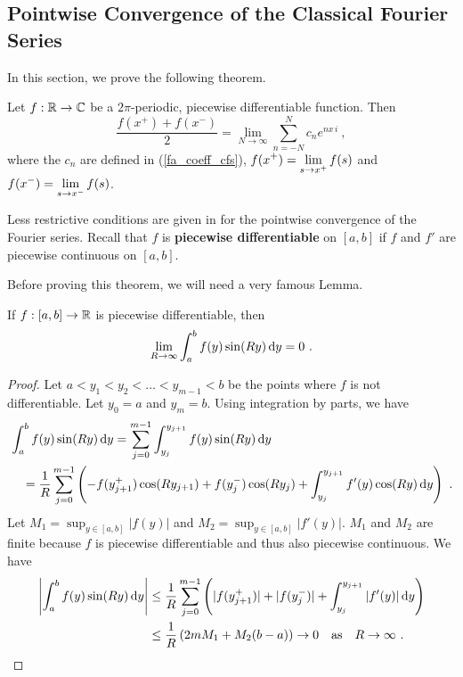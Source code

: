 \subsection{Pointwise Convergence of the Classical Fourier Series}
\label{sectPtWsConv}

In this section, we prove the following theorem.

\begin{theorem}
Let $f:\mathbb{R}\to \mathbb{C}$ be a $2\pi$-periodic,     { \label{faFsPwc} }
piecewise differentiable function.  Then
\[
\frac{f(x^+) + f(x^-)}{2} = \lim_{N\to \infty} \sum_{n=-N}^N c_n e^{n x\, i} \ ,
\]
where the $c_n$ are defined in (\ref{fa_coeff_cfs}),
$\displaystyle f(x^+) = \lim_{s\to x^+} f(s)$ and
$\displaystyle f(x^-) = \lim_{s\to x^-} f(s)$.
\end{theorem}

Less restrictive conditions are given in \cite{RuPMA} for the
pointwise convergence of the Fourier series.  Recall that $f$ is
{\bfseries piecewise differentiable}
on $[a,b]$ if $f$ and $f'$ are piecewise continuous on $[a,b]$.

Before proving this theorem, we will need a very famous Lemma.

\begin{lemma}
If $f:[a,b] \to \mathbb{R}$ is piecewise differentiable, then
\[
\lim_{R\to \infty} \int_a^b f(y) \sin(Ry) \,\mathrm{d}{y} = 0 \ .
\]
\end{lemma}

\begin{proof}
Let $a < y_1 < y_2 < \ldots < y_{m-1} < b$ be the points where $f$ is
not differentiable.  Let $y_0 = a$ and $y_m = b$.  Using integration
by parts, we have
\begin{align*}
&\int_a^b  f(y) \sin(Ry) \,\mathrm{d}{y}
= \sum_{j=0}^{m-1} \int_{y_j}^{y_{j+1}} f(y) \sin(Ry) \,\mathrm{d}{y} \\
& \quad = \frac{1}{R} \sum_{j=0}^{m-1} \left( -f(y_{j+1}^+)\cos(Ry_{j+1})
+ f(y_j^-)\cos(Ry_j) + \int_{y_j}^{y_{j+1}} f'(y) \cos(Ry) \,\mathrm{d}{y} \right) \ .
\end{align*}
Let $M_1 = \sup_{y\in[a,b]} |f(y)|$ and $M_2 = \sup_{y\in[a,b]}|f'(y)|$.
$M_1$ and $M_2$ are finite because $f$ is piecewise differentiable and
thus also piecewise continuous.  We have
\begin{align*}
\left| \int_a^b  f(y) \sin(Ry) \,\mathrm{d}{y} \right|
& \leq \frac{1}{R} \sum_{j=0}^{m-1} \left( |f(y_{j+1}^+)| + |f(y_j^-)|
+ \int_{y_j}^{y_{j+1}} |f'(y)| \,\mathrm{d}{y} \right) \\
& \leq \frac{1}{R} \left( 2m M_1 + M_2 (b-a) \right) \to 0 \quad \text{as}
\quad R \to \infty \ .  \qedhere
\end{align*}
\end{proof}

